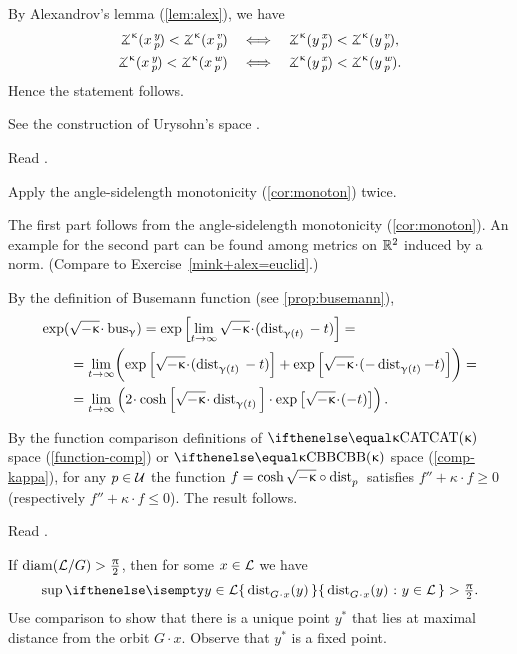 By Alexandrov's lemma (\ref{lem:alex}), we have
\begin{align*}
\angk\kappa xyp<\angk\kappa xvp
\quad&\Longleftrightarrow\quad
\angk\kappa yxp<\angk\kappa yvp,
\\
\angk\kappa xyp<\angk\kappa xwp
\quad&\Longleftrightarrow\quad
\angk\kappa yxp<\angk\kappa ywp.
\end{align*}
Hence the statement follows.


 See the construction of Urysohn's space \cite[3.11$\tfrac{3}{2}_+$]{gromov-MS}.

Read \cite{lebedeva-petrunin}.

Apply the angle-sidelength  monotonicity (\ref{cor:monoton}) twice. 

The first part follows from the angle-sidelength  monotonicity (\ref{cor:monoton}).
An example for the second part can be found among metrics on $\mathbb{R}^2$ induced by a norm. (Compare to Exercise~\ref{mink+alex=euclid}.)

By the definition of Busemann function (see  \ref{prop:busemann}),
\begin{align*}
\exp(&\sqrt{-\kappa}\cdot\bus_\gamma) 
= \exp \left[\lim_{t\to \infty} \sqrt{-\kappa}\cdot(\distfun{{\gamma (t)}}{}{} - t)\right]=
\\
&= \lim_{t\to \infty} \biggl(\exp \left[\sqrt{-\kappa}\cdot(\distfun{\gamma (t)}{}{} -t)\right]
+\exp\left[\sqrt{-\kappa}\cdot(-\distfun{\gamma (t)}-t)\right]\biggr)=
\\
&=  \lim_{t\to \infty} \left(2\cdot \cosh \left[\sqrt{-\kappa}\cdot\distfun{\gamma (t)}{}{}\right]\cdot \exp\left[\sqrt{-\kappa}\cdot(-t)\right]\right).
\end{align*}

By the function comparison definitions of $\CAT\kappa$ space (\ref{function-comp}) or $\Alex{\kappa}$ space (\ref{comp-kappa}),  for any $p\in \spc{U}$ the function $f=\cosh \sqrt{-\kappa}\circ\distfun{p}{}{}$ satisfies $f''+\kappa \cdot f\ge 0$ (respectively  $f''+\kappa \cdot f\le 0$). The result follows.

 Read \cite{petrunin:globalization}.

 If $\mathop{\rm diam}\nolimits(\mathcal{L}/G)>\tfrac{\uppi}2$, then for some $x\in \spc{L}$ we have
\[\sup \set{\distfun{G\cdot x}(y)}{y\in \spc{L}}
>
\tfrac\pi2.\]
Use comparison to show that there is a unique point $y^{*}$ that lies at maximal distance from the orbit $G\cdot x$.
Observe that $y^{*}$ is a fixed point.

